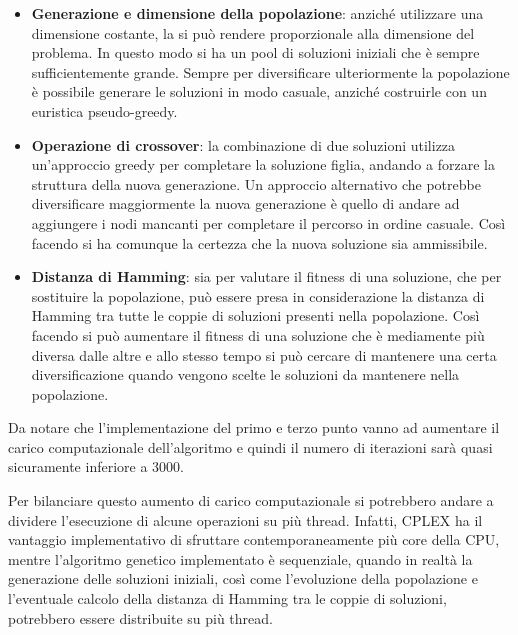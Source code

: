 \begin{itemize}
	\item \textbf{Generazione e dimensione della popolazione}: anziché utilizzare una dimensione costante, la si può rendere proporzionale alla dimensione del problema. In questo modo si ha un pool di soluzioni iniziali che è sempre sufficientemente grande.
	Sempre per diversificare ulteriormente la popolazione è possibile generare le soluzioni in modo casuale, anziché costruirle con un euristica pseudo-greedy.
	\item \textbf{Operazione di crossover}: la combinazione di due soluzioni utilizza un'approccio greedy per completare la soluzione figlia, andando a forzare la struttura della nuova generazione. Un approccio alternativo che potrebbe diversificare maggiormente la nuova generazione è quello di andare ad aggiungere i nodi mancanti per completare il percorso in ordine casuale. Così facendo si ha comunque la certezza che la nuova soluzione sia ammissibile.
	\item \textbf{Distanza di Hamming}: sia per valutare il fitness di una soluzione, che per sostituire la popolazione, può essere presa in considerazione la distanza di Hamming tra tutte le coppie di soluzioni presenti nella popolazione. Così facendo si può aumentare il fitness di una soluzione che è mediamente più diversa dalle altre e allo stesso tempo si può cercare di mantenere una certa diversificazione quando vengono scelte le soluzioni da mantenere nella popolazione.
\end{itemize}

Da notare che l'implementazione del primo e terzo punto vanno ad aumentare il carico computazionale dell'algoritmo e quindi il numero di iterazioni sarà quasi sicuramente inferiore a 3000.

Per bilanciare questo aumento di carico computazionale si potrebbero andare a dividere l'esecuzione di alcune operazioni su più thread. 
Infatti, CPLEX ha il vantaggio implementativo di sfruttare contemporaneamente più core della CPU, mentre l'algoritmo genetico implementato è sequenziale, quando in realtà la generazione delle soluzioni iniziali, così come l'evoluzione della popolazione e l'eventuale calcolo della distanza di Hamming tra le coppie di soluzioni, potrebbero essere distribuite su più thread.

















